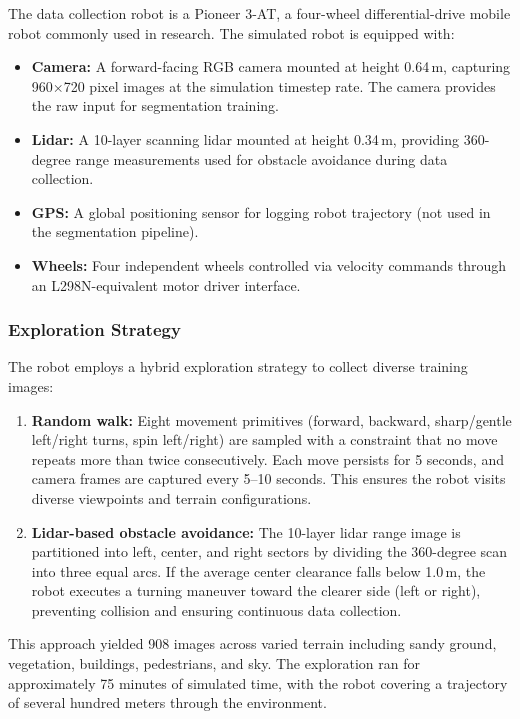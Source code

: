 \documentclass[12pt,a4paper]{article}
\begin{document}
The data collection robot is a Pioneer 3-AT, a four-wheel differential-drive mobile robot commonly used in research. The simulated robot is equipped with:

\begin{itemize}[noitemsep]
    \item \textbf{Camera:} A forward-facing RGB camera mounted at height 0.64\,m, capturing 960$\times$720 pixel images at the simulation timestep rate. The camera provides the raw input for segmentation training.
    \item \textbf{Lidar:} A 10-layer scanning lidar mounted at height 0.34\,m, providing 360-degree range measurements used for obstacle avoidance during data collection.
    \item \textbf{GPS:} A global positioning sensor for logging robot trajectory (not used in the segmentation pipeline).
    \item \textbf{Wheels:} Four independent wheels controlled via velocity commands through an L298N-equivalent motor driver interface.
\end{itemize}

\subsubsection{Exploration Strategy}

The robot employs a hybrid exploration strategy to collect diverse training images:

\begin{enumerate}[noitemsep]
    \item \textbf{Random walk:} Eight movement primitives (forward, backward, sharp/gentle left/right turns, spin left/right) are sampled with a constraint that no move repeats more than twice consecutively. Each move persists for 5 seconds, and camera frames are captured every 5--10 seconds. This ensures the robot visits diverse viewpoints and terrain configurations.

    \item \textbf{Lidar-based obstacle avoidance:} The 10-layer lidar range image is partitioned into left, center, and right sectors by dividing the 360-degree scan into three equal arcs. If the average center clearance falls below 1.0\,m, the robot executes a turning maneuver toward the clearer side (left or right), preventing collision and ensuring continuous data collection.
\end{enumerate}

This approach yielded 908 images across varied terrain including sandy ground, vegetation, buildings, pedestrians, and sky. The exploration ran for approximately 75 minutes of simulated time, with the robot covering a trajectory of several hundred meters through the environment.
\end{document}
